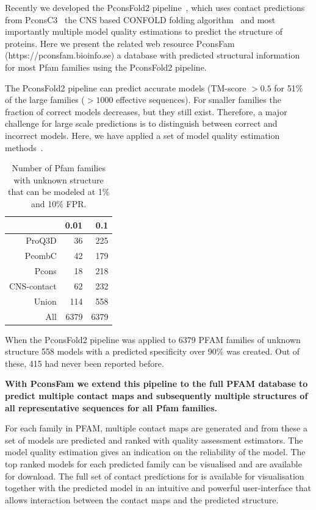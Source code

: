 \documentclass[a4,center,fleqn]{NAR}
\begin{document}
Recently we developed the PconsFold2 pipeline~\cite{Michel28881974}, which uses contact
predictions from PconsC3~\cite{Michel28535189} the CNS based CONFOLD folding
algorithm~\cite{Adhikari25974172} and most importantly multiple model quality estimations
\cite{Uziela28052925,Lundstrom:2001} to predict the structure of
proteins. Here we present the related web resource PconsFam
(https://pconsfam.bioinfo.se) a database with predicted structural
information for most Pfam families using the PconsFold2
pipeline.


The PconsFold2 pipeline can predict accurate models (TM-score $>0.5$
for 51\% of the large families ($>1000$ effective sequences). For
smaller families the fraction of correct models decreases, but they
still exist. Therefore, a major challenge for large scale predictions
is to distinguish between correct and incorrect models. Here, we have
applied a set of model quality estimation methods~\cite{Kryshtafovych28833563}.


\begin{table}[bt!]
\centering
\caption{Number of Pfam families with unknown structure that can be modeled at
1\% and 10\% FPR.}
\label{tab:nopdb1}
\begin{tabular}{rrr}
  \hline
 & 0.01 & 0.1 \\ 
  \hline
  ProQ3D & 36 & 225 \\ 
  PcombC & 42 & 179 \\ 
  Pcons & 18 & 218 \\ 
  CNS-contact & 62 & 232 \\  \hline 
  Union & 114 & 558 \\ 
  All & 6379 &  6379 \\ 
   \hline
\end{tabular}
\end{table}


When the PconsFold2 pipeline was applied to 6379 PFAM families of
unknown structure 558 models with a predicted specificity over 90\% was
created. Out of these, 415 had never been reported before.

{\bf With
PconsFam we extend this pipeline to the full PFAM database to predict
multiple contact maps and subsequently multiple structures of all
representative sequences for all Pfam families. }

For each family in
PFAM, multiple contact maps are generated and from these a set of
models are predicted and ranked with quality assessment
estimators. The model quality estimation gives an indication on the
reliability of the model. The top ranked models for each predicted
family can be visualised and are available for download. The full set
of contact predictions for is available for visualisation together
with the predicted model in an intuitive and powerful user-interface
that allows interaction between the contact maps and the predicted
structure. 
\end{document}
